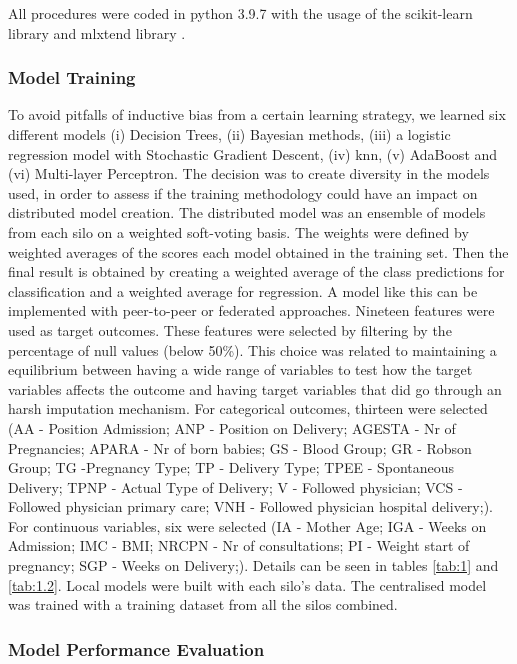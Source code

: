 All procedures were coded in python 3.9.7 with the usage of the scikit-learn library \cite{scikit-learn} and mlxtend library \cite{mlxtend}.


\subsubsection{Model Training}
To avoid pitfalls of inductive bias from a certain learning strategy, we learned six different models (i) Decision Trees, (ii) Bayesian methods, (iii) a logistic regression model with Stochastic Gradient Descent, (iv) \ac{knn}, (v) AdaBoost and (vi) Multi-layer Perceptron. The decision was to create diversity in the models used, in order to assess if the training methodology could have an impact on distributed model creation.
The distributed model was an ensemble of models from each silo on a weighted soft-voting basis. The weights were defined by weighted averages of the scores each model obtained in the training set. Then the final result is obtained by creating a weighted average of the class predictions for classification and a weighted average for regression. A model like this can be implemented with peer-to-peer or federated approaches.
Nineteen features were used as target outcomes. These features were selected by filtering by the percentage of null values (below 50\%). This choice was related to maintaining a equilibrium between having a wide range of variables to test how the target variables affects the outcome and having target variables that did go through an harsh imputation mechanism. For categorical outcomes, thirteen were selected (AA - Position Admission; ANP - Position on Delivery; AGESTA - Nr of Pregnancies; APARA - Nr of born babies; GS - Blood Group; GR - Robson Group; TG -Pregnancy Type; TP - Delivery Type; TPEE - Spontaneous Delivery; TPNP - Actual Type of Delivery; V - Followed physician; VCS - Followed physician primary care; VNH - Followed physician hospital delivery;). For continuous variables, six were selected (IA - Mother Age; IGA - Weeks on Admission; IMC - BMI; NRCPN - Nr of consultations; PI - Weight start of pregnancy; SGP - Weeks on Delivery;). Details can be seen in tables \ref{tab:1} and \ref{tab:1.2}.
Local models were built with each silo's data. The centralised model was trained with a training dataset from all the silos combined. 


\subsubsection{Model Performance Evaluation}

